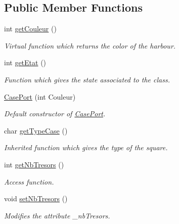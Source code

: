 \subsection*{Public Member Functions}
\begin{DoxyCompactItemize}
\item 
int \hyperlink{class_case_port_a5b20959b6704c780287b57b8e44fe72a}{getCouleur} ()
\begin{DoxyCompactList}\small\item\em Virtual function which returns the color of the harbour. \item\end{DoxyCompactList}\item 
int \hyperlink{class_case_port_ad541f8d3b3f4d17d009e41a254caeae1}{getEtat} ()
\begin{DoxyCompactList}\small\item\em Function which gives the state associated to the class. \item\end{DoxyCompactList}\item 
\hyperlink{class_case_port_a4bd64b1743c6be7a8cafe4c5be011e5e}{CasePort} (int Couleur)
\begin{DoxyCompactList}\small\item\em Default constructor of \hyperlink{class_case_port}{CasePort}. \item\end{DoxyCompactList}\item 
char \hyperlink{class_case_port_ace3204ad6d79bf8820e279c7f223595f}{getTypeCase} ()
\begin{DoxyCompactList}\small\item\em Inherited function which gives the type of the square. \item\end{DoxyCompactList}\item 
int \hyperlink{class_case_port_aa2f0f95025140925f0f1c3cdc6b9be5c}{getNbTresors} ()
\begin{DoxyCompactList}\small\item\em Access function. \item\end{DoxyCompactList}\item 
\hypertarget{class_case_port_aa647ce23ecae5dc8543cf37c7729f65c}{
void \hyperlink{class_case_port_aa647ce23ecae5dc8543cf37c7729f65c}{setNbTresors} ()}
\label{class_case_port_aa647ce23ecae5dc8543cf37c7729f65c}

\begin{DoxyCompactList}\small\item\em Modifies the attribute \_\-nbTresors. \item\end{DoxyCompactList}\end{DoxyCompactItemize}


